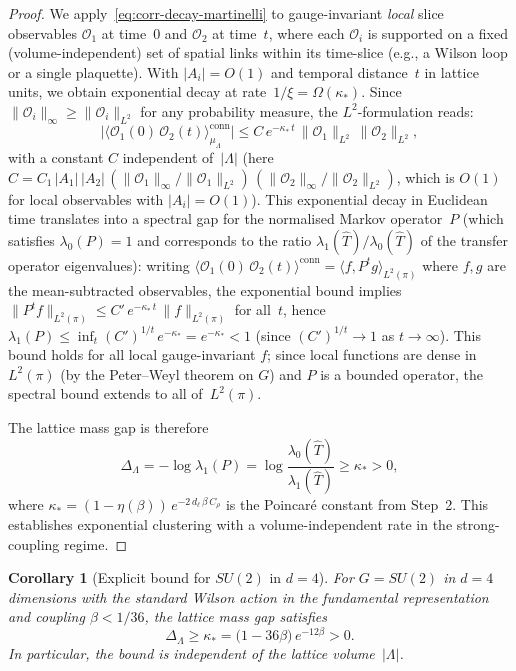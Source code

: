 \documentclass[12pt,a4paper]{article}
\theoremstyle{definition}
\theoremstyle{plain}
\newtheorem{corollary}[definition]{Corollary}
\theoremstyle{remark}
\begin{document}
\begin{proof}
We apply~\eqref{eq:corr-decay-martinelli} to gauge-invariant \emph{local} slice observables $\mathcal{O}_1$ at time~$0$ and $\mathcal{O}_2$ at time~$t$, where each $\mathcal{O}_i$ is supported on a fixed (volume-independent) set of spatial links within its time-slice (e.g., a Wilson loop or a single plaquette). With $|A_i| = O(1)$ and temporal distance~$t$ in lattice units, we obtain exponential decay at rate~$1/\xi = \Omega(\kappa_*)$. Since $\|\mathcal{O}_i\|_\infty \geq \|\mathcal{O}_i\|_{L^2}$ for any probability measure, the $L^2$-formulation reads:
\[
    \bigl|\langle \mathcal{O}_1(0)\,\mathcal{O}_2(t)\rangle_{\mu_\Lambda}^{\mathrm{conn}}\bigr|
    \leq C\,e^{-\kappa_*\,t}\,\|\mathcal{O}_1\|_{L^2}\,\|\mathcal{O}_2\|_{L^2},
\]
with a constant $C$ independent of~$|\Lambda|$ (here $C = C_1\,|A_1|\,|A_2|\,(\|\mathcal{O}_1\|_\infty/\|\mathcal{O}_1\|_{L^2})\,(\|\mathcal{O}_2\|_\infty/\|\mathcal{O}_2\|_{L^2})$, which is $O(1)$ for local observables with $|A_i| = O(1)$). This exponential decay in Euclidean time translates into a spectral gap for the normalised Markov operator~$P$ (which satisfies $\lambda_0(P) = 1$ and corresponds to the ratio $\lambda_1(\hat{T})/\lambda_0(\hat{T})$ of the transfer operator eigenvalues): writing $\langle \mathcal{O}_1(0)\,\mathcal{O}_2(t)\rangle^{\mathrm{conn}} = \langle f, P^t g\rangle_{L^2(\pi)}$ where $f, g$ are the mean-subtracted observables, the exponential bound implies $\|P^t f\|_{L^2(\pi)} \leq C'\,e^{-\kappa_*\,t}\,\|f\|_{L^2(\pi)}$ for all~$t$, hence $\lambda_1(P) \leq \inf_t (C')^{1/t}\,e^{-\kappa_*} = e^{-\kappa_*} < 1$ (since $(C')^{1/t} \to 1$ as $t \to \infty$). This bound holds for all local gauge-invariant $f$; since local functions are dense in $L^2(\pi)$ (by the Peter--Weyl theorem on $G$) and $P$ is a bounded operator, the spectral bound extends to all of~$L^2(\pi)$.

The lattice mass gap is therefore
\begin{equation}
    \Delta_\Lambda = -\log\lambda_1(P) = \log\frac{\lambda_0(\hat{T})}{\lambda_1(\hat{T})} \geq \kappa_* > 0,
\end{equation}
where $\kappa_* = (1 - \eta(\beta))\,e^{-2\,d_\ell\,\beta\,C_\rho}$ is the Poincar\'e constant from Step~2.
This establishes exponential clustering with a volume-independent rate in the strong-coupling regime.
\end{proof}

\begin{corollary}[Explicit bound for $SU(2)$ in $d=4$]
\label{cor:su2-explicit}
For $G = SU(2)$ in $d = 4$ dimensions with the standard Wilson action in the fundamental representation and coupling $\beta < 1/36$, the lattice mass gap satisfies
\begin{equation}\label{eq:su2-gap}
    \Delta_\Lambda \geq \kappa_* = \bigl(1 - 36\beta\bigr)\,e^{-12\beta} > 0.
\end{equation}
In particular, the bound is independent of the lattice volume~$|\Lambda|$.
\end{corollary}
\end{document}
